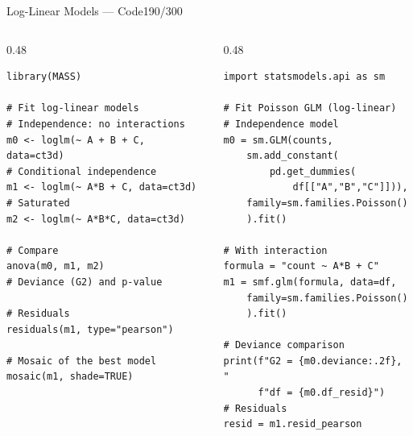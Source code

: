 \documentclass[10pt]{beamer}
\newcommand{\smark}[1]{\hfill{\scriptsize\color{codegray}#1}}
\begin{document}
\begin{frame}[fragile]{Log-Linear Models --- Code}\smark{190/300}
\begin{columns}[T]
\begin{column}{0.48\textwidth}
\begin{lstlisting}[style=Rstyle]
library(MASS)

# Fit log-linear models
# Independence: no interactions
m0 <- loglm(~ A + B + C, data=ct3d)
# Conditional independence
m1 <- loglm(~ A*B + C, data=ct3d)
# Saturated
m2 <- loglm(~ A*B*C, data=ct3d)

# Compare
anova(m0, m1, m2)
# Deviance (G2) and p-value

# Residuals
residuals(m1, type="pearson")

# Mosaic of the best model
mosaic(m1, shade=TRUE)
\end{lstlisting}
\end{column}
\begin{column}{0.48\textwidth}
\begin{lstlisting}[style=Pystyle]
import statsmodels.api as sm

# Fit Poisson GLM (log-linear)
# Independence model
m0 = sm.GLM(counts,
    sm.add_constant(
        pd.get_dummies(
            df[["A","B","C"]])),
    family=sm.families.Poisson()
    ).fit()

# With interaction
formula = "count ~ A*B + C"
m1 = smf.glm(formula, data=df,
    family=sm.families.Poisson()
    ).fit()

# Deviance comparison
print(f"G2 = {m0.deviance:.2f}, "
      f"df = {m0.df_resid}")
# Residuals
resid = m1.resid_pearson
\end{lstlisting}
\end{column}
\end{columns}
\end{frame}
\end{document}
